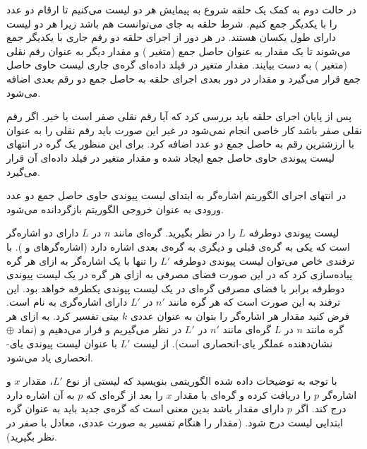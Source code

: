 در حالت دوم به کمک یک حلقه شروع به پیمایش هر دو لیست می‌کنیم تا ارقام دو عدد را با یکدیگر جمع کنیم. شرط حلقه‌ به جای
{} می‌توانست {} هم باشد زیرا هر دو لیست دارای طول یکسان هستند. در هر دور از اجرای حلقه دو رقم جاری با یکدیگر جمع می‌شوند تا یک مقدار به عنوان حاصل جمع (متغیر {}) و مقدار دیگر به عنوان رقم نقلی (متغیر {}) به دست بیایند. مقدار متغیر {} در فیلد داده‌‌ای گره‌ی جاری لیست حاوی حاصل جمع قرار می‌گیرد و مقدار {} در دور بعدی اجرای حلقه به حاصل جمع دو رقم بعدی اضافه می‌شود.

پس از پایان اجرای حلقه باید بررسی کرد که آیا رقم نقلی صفر است یا خیر. اگر رقم نقلی صفر باشد کار خاصی انجام نمی‌شود در غیر این صورت باید رقم نقلی را به عنوان با ارزشترین رقم به حاصل جمع دو عدد اضافه کرد. برای این منظور یک گره در انتهای لیست پیوندی حاوی حاصل جمع ایجاد شده و مقدار متغیر {} در فیلد داده‌ای آن قرار می‌گیرد.

در انتهای اجرای الگوریتم اشاره‌گر به ابتدای لیست پیوندی حاوی حاصل جمع دو عدد ورودی به عنوان خروجی الگوریتم بازگردانده می‌شود.


 لیست پیوندی دوطرفه {$L$} را در نظر بگیرید. گره‌ای مانند {$n$} در {$L$} دارای دو اشاره‌گر است که یکی به گره‌ی قبلی و دیگری به گره‌ی بعدی اشاره دارد (اشاره‌گرهای {} و {}). با ترفندی خاص می‌توان لیست پیوندی دوطرفه {$L'$} را تنها با یک اشاره‌گر به ازای هر گره پیاده‌سازی کرد که در این صورت فضای مصرفی به ازای هر گره در یک لیست پیوندی دوطرفه برابر با فضای مصرفی گره‌ای در یک لیست پیوندی یکطرفه خواهد بود. این ترفند به این صورت است که هر گره مانند {$n'$} در {$L'$} دارای اشاره‌گری به نام {} است. فرض کنید مقدار هر اشاره‌گر را بتوان به عنوان عددی {$k$} بیتی تفسیر کرد. به ازای هر گره مانند {$n$} در {$L$} گره‌ای مانند {$n'$} در {$L'$} در نظر می‌گیریم و قرار می‌دهیم {
و  {} (نماد {$\oplus$} نشان‌دهنده عملگر یای-انحصاری} است). از لیست {$L'$} با عنوان لیست پیوندی یای-انحصاری یاد می‌شود.

با توجه به توضیحات داده شده الگوریتمی بنویسید که لیستی از نوع {$L'$}، مقدار {$x$} و اشاره‌گر {$p$} را دریافت کرده و گره‌ای با مقدار {$x$} را بعد از گره‌ای که {$p$} به آن اشاره دارد درج کند. اگر  {$p$} دارای مقدار {} باشد بدین معنی است که گره‌ی جدید باید به عنوان گره ابتدایی لیست درج شود. (مقدار {} را هنگام تفسیر به صورت عددی، معادل با صفر در نظر بگیرید).

